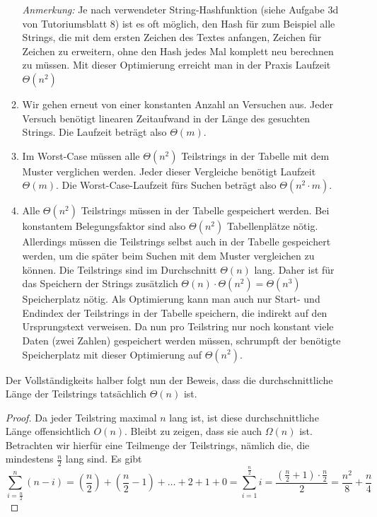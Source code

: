 \documentclass[11pt,a4paper]{article}
\begin{document}
\begin{loesung}
\begin{enumerate}
\begin{enumerate}[label=\roman*)]
            \emph{Anmerkung:} Je nach verwendeter String-Hashfunktion (siehe Aufgabe 3d von Tutoriumsblatt 8) ist es oft möglich, den Hash für zum Beispiel alle Strings, die mit dem ersten Zeichen des Textes anfangen, Zeichen für Zeichen zu erweitern, ohne den Hash jedes Mal komplett neu berechnen zu müssen.
            Mit dieser Optimierung erreicht man in der Praxis Laufzeit $\Theta(n^2)$
            \item Wir gehen erneut von einer konstanten Anzahl an Versuchen aus.
            Jeder Versuch benötigt linearen Zeitaufwand in der Länge des gesuchten Strings.
            Die Laufzeit beträgt also $\Theta(m)$.
            \item Im Worst-Case müssen alle $\Theta(n^2)$ Teilstrings in der Tabelle mit dem Muster verglichen werden.
            Jeder dieser Vergleiche benötigt Laufzeit $\Theta(m)$.
            Die Worst-Case-Laufzeit fürs Suchen beträgt also $\Theta(n^2\cdot m)$.
            \item Alle $\Theta(n^2)$ Teilstrings müssen in der Tabelle gespeichert werden.
            Bei konstantem Belegungsfaktor sind also $\Theta(n^2)$ Tabellenplätze nötig.
            Allerdings müssen die Teilstrings selbst auch in der Tabelle gespeichert werden, um die später beim Suchen mit dem Muster vergleichen zu können.
            Die Teilstrings sind im Durchschnitt $\Theta(n)$ lang.
            Daher ist für das Speichern der Strings zusätzlich $\Theta(n) \cdot \Theta(n^2) = \Theta(n^3)$ Speicherplatz nötig.
            Als Optimierung kann man auch nur Start- und Endindex der Teilstrings in der Tabelle speichern, die indirekt auf den Ursprungstext verweisen.
            Da nun pro Teilstring nur noch konstant viele Daten (zwei Zahlen) gespeichert werden müssen, schrumpft der benötigte Speicherplatz mit dieser Optimierung auf $\Theta(n^2)$.
        \end{enumerate}
        Der Vollständigkeits halber folgt nun der Beweis, dass die durchschnittliche Länge der Teilstrings tatsächlich $\Theta(n)$ ist.
        \begin{proof}
            Da jeder Teilstring maximal $n$ lang ist, ist diese durchschnittliche Länge offensichtlich $O(n)$.
            Bleibt zu zeigen, dass sie auch $\Omega(n)$ ist.
            Betrachten wir hierfür eine Teilmenge der Teilstrings, nämlich die, die mindestens $\frac{n}{2}$ lang sind.
            Es gibt 
            \begin{equation*}
                \sum\limits_{i = \frac{n}{2}}^n (n - i) = \left(\frac{n}{2}\right) + \left(\frac{n}{2} - 1\right) + \ldots + 2 + 1 + 0 = \sum\limits_{i = 1}^{\frac{n}{2}} i = \frac{\left(\frac{n}{2} + 1\right) \cdot \frac{n}{2}}{2} = \frac{n^2}{8} + \frac{n}{4} 

\end{equation*}
\end{proof}
\end{enumerate}
\end{loesung}
\end{document}
